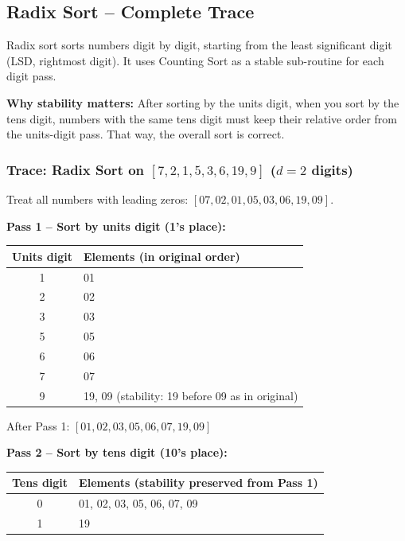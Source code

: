 \documentclass[12pt,portrait]{article}
\begin{document}
\subsection{Radix Sort -- Complete Trace}

\begin{rulebox}
Radix sort sorts numbers digit by digit, starting from the least significant digit (LSD, rightmost digit). It uses Counting Sort as a stable sub-routine for each digit pass.

\textbf{Why stability matters:} After sorting by the units digit, when you sort by the tens digit, numbers with the same tens digit must keep their relative order from the units-digit pass. That way, the overall sort is correct.
\end{rulebox}

\subsubsection{Trace: Radix Sort on $[7,2,1,5,3,6,19,9]$ ($d=2$ digits)}

Treat all numbers with leading zeros: $[07,02,01,05,03,06,19,09]$.

\textbf{Pass 1 -- Sort by units digit (1's place):}

\begin{center}
\begin{tabular}{c|l}
\toprule
\textbf{Units digit} & \textbf{Elements (in original order)} \\
\midrule
1 & 01 \\
2 & 02 \\
3 & 03 \\
5 & 05 \\
6 & 06 \\
7 & 07 \\
9 & 19, 09 (stability: 19 before 09 as in original) \\
\bottomrule
\end{tabular}
\end{center}

After Pass 1: $[01, 02, 03, 05, 06, 07, 19, 09]$

\textbf{Pass 2 -- Sort by tens digit (10's place):}

\begin{center}
\begin{tabular}{c|l}
\toprule
\textbf{Tens digit} & \textbf{Elements (stability preserved from Pass 1)} \\
\midrule
0 & 01, 02, 03, 05, 06, 07, 09 \\
1 & 19 \\
\bottomrule
\end{tabular}
\end{center}
\end{document}
